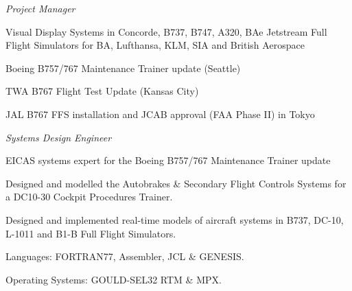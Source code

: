 \documentclass[10pt]{article}
\newenvironment{outerlist}[1][\enskip\textbullet]%
        {\begin{itemize}[#1]}{\end{itemize}%
         \vspace{-.6\baselineskip}}
\newenvironment{innerlist}[1][\enskip\textbullet]%
        {\begin{compactitem}[#1]}{\end{compactitem}}
\newcommand{\blankline}{\quad\pagebreak[2]}
\begin{document}
\begin{outerlist}
\item[] \textit{Project Manager}%
	\begin{innerlist}
	\item Visual Display Systems in Concorde, B737, B747, A320, BAe Jetstream Full Flight Simulators for BA, Lufthansa, KLM, SIA and British Aerospace
	\item Boeing B757/767 Maintenance Trainer update (Seattle)
	\item TWA B767 Flight Test Update (Kansas City)
	\item JAL B767 FFS installation and JCAB approval (FAA Phase II) in Tokyo
	\end{innerlist}

\item[] \textit{Systems Design Engineer} %
	\begin{innerlist}
	\item EICAS systems expert for the Boeing B757/767 Maintenance Trainer update
	\item Designed and modelled the Autobrakes \& Secondary Flight Controls Systems for a DC10-30 Cockpit Procedures Trainer.
	\item Designed and implemented real-time models of aircraft systems in B737, DC-10, L-1011 and B1-B Full Flight Simulators.
	\item Languages: FORTRAN77, Assembler, JCL \& GENESIS.
	\item Operating Systems: GOULD-SEL32 RTM \& MPX.
	\end{innerlist}
\end{outerlist}

\blankline

%
%
%
\end{document}
